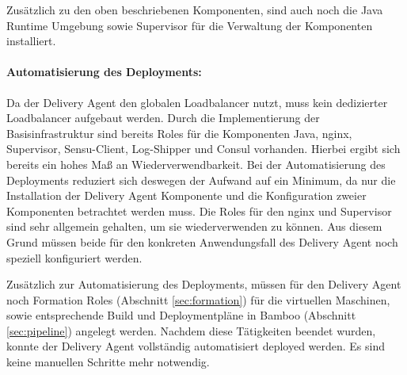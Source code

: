 Zusätzlich zu den oben beschriebenen Komponenten, sind auch noch die Java Runtime Umgebung sowie Supervisor für die Verwaltung der Komponenten installiert.

\paragraph{Automatisierung des Deployments:}
Da der Delivery Agent den globalen Loadbalancer nutzt, muss kein dedizierter Loadbalancer aufgebaut werden. Durch die Implementierung der Basisinfrastruktur sind bereits Roles für die Komponenten Java, nginx, Supervisor, Sensu-Client, Log-Shipper und Consul vorhanden. Hierbei ergibt sich bereits ein hohes Maß an Wiederverwendbarkeit. Bei der Automatisierung des Deployments reduziert sich deswegen der Aufwand auf ein Minimum, da nur die Installation der Delivery Agent Komponente und die Konfiguration zweier Komponenten betrachtet werden muss. Die Roles für den nginx und Supervisor sind sehr allgemein gehalten, um sie wiederverwenden zu können. Aus diesem Grund müssen beide für den konkreten Anwendungsfall des Delivery Agent noch speziell konfiguriert werden.

Zusätzlich zur Automatisierung des Deployments, müssen für den Delivery Agent noch Formation Roles (Abschnitt \ref{sec:formation}) für die virtuellen Maschinen, sowie entsprechende Build und Deploymentpläne in Bamboo (Abschnitt \ref{sec:pipeline}) angelegt werden. Nachdem diese Tätigkeiten beendet wurden, konnte der Delivery Agent vollständig automatisiert deployed werden. Es sind keine manuellen Schritte mehr notwendig.

